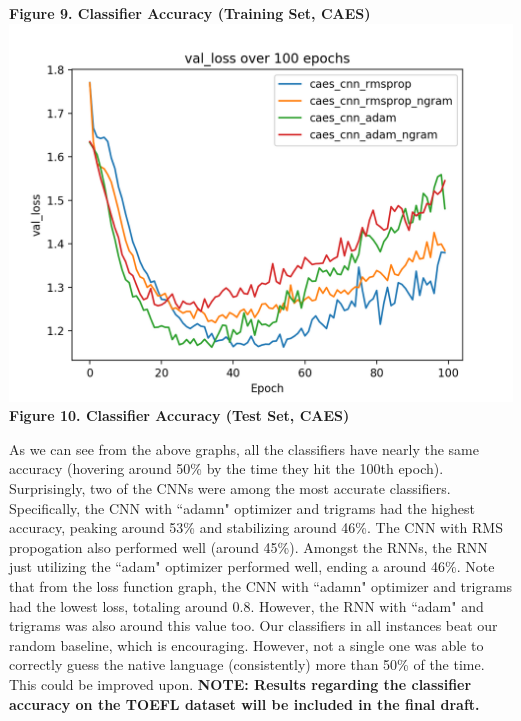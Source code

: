 \documentclass[11pt,a4paper]{article}
\newcommand\tab[1][1cm]{\hspace*{#1}}
\begin{document}
\begin{center}
	\small \textbf{Figure 9. Classifier Accuracy (Training Set, CAES)}
	\includegraphics[scale=0.5]{vlo}\\
	\small\textbf{Figure 10. Classifier Accuracy (Test Set, CAES) }
\end{center}
\tab As we can see from the above graphs, all the classifiers have nearly the same accuracy (hovering around 50\% by the time they hit the 100th epoch). Surprisingly, two of the CNNs were among the most accurate classifiers. Specifically, the CNN with ``adamn" optimizer and trigrams had the highest accuracy, peaking around 53\% and stabilizing around 46\%. The CNN with RMS propogation also performed well (around 45\%). Amongst the RNNs, the RNN just utilizing the ``adam" optimizer performed well, ending a around 46\%. Note that from the loss function graph, the CNN with ``adamn" optimizer and trigrams had the lowest loss, totaling around 0.8. However, the RNN with ``adam" and trigrams was also around this value too. Our classifiers in all instances beat our random baseline, which is encouraging. However, not a single one was able to correctly guess the native language (consistently) more than 50\% of the time. This could be improved upon. \textbf{NOTE: Results regarding the classifier accuracy on the TOEFL dataset will be included in the final draft.}
\end{document}
